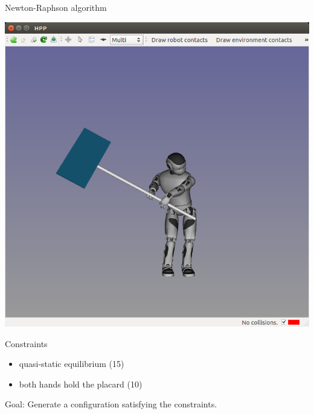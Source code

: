 \begin {frame} {Newton-Raphson algorithm}
  \parbox {.5\linewidth} {
    \centerline {
      \includegraphics [width=\linewidth] {figures/seq/romeo-7.png}
    }
  }
  \hspace*{.05\linewidth}
  \parbox {.39\linewidth} {
    Constraints
    \begin {itemize}
    \item quasi-static equilibrium (15)
    \item both hands hold the placard (10)
    \end{itemize}
  }
  \centerline {
    Goal: Generate a configuration satisfying the constraints.
  }
\end {frame}

